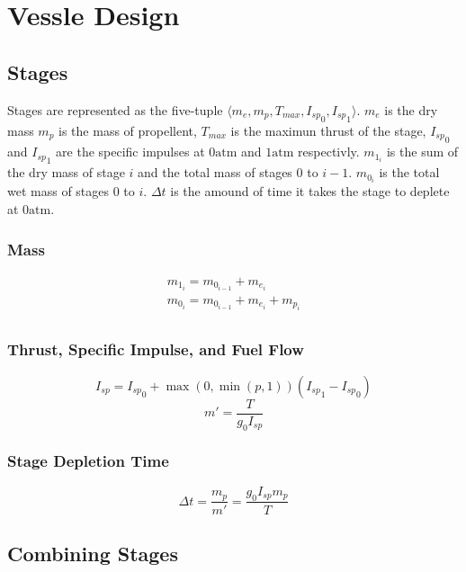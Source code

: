 \section{Vessle Design}
\subsection{Stages}
Stages are represented as the five-tuple $\langle m_e, m_p, T_{max}, {I_{sp}}_0, {I_{sp}}_1 \rangle$. $m_e$ is the dry mass
$m_p$ is the mass of propellent, $T_{max}$ is the maximun thrust of the stage, ${I_{sp}}_0$ and ${I_{sp}}_1$ are the specific impulses at
$0\mathrm{atm}$ and $1\mathrm{atm}$ respectivly. $m_{1_i}$ is the sum of the dry mass of stage $i$ and the total mass of stages 0 to $i-1$.
$m_{0_i}$ is the total wet mass of stages 0 to $i$. $\Delta{}t$ is the amound of time it takes the stage to deplete at $0\mathrm{atm}$.
\subsubsection{Mass}
\begin{equation}
    \label{stage_mass}
    \begin{array}{c}
        m_{1_i} = m_{0_{i-1}} + m_{e_{i}} \\
        m_{0_i} = m_{0_{i-1}} + m_{e_{i}} + m_{p_{i}} \\
    \end{array}
\end{equation}
\subsubsection{Thrust, Specific Impulse, and Fuel Flow}
\begin{equation}
    \label{stage_isp}
    I_{sp} = {I_{sp}}_{0}+\max\left(0,\min\left(p,1\right)\right)\left({I_{sp}}_{1} - {I_{sp}}_{0}\right)
\end{equation}
\begin{equation}
    \label{stage_ff}
    m' = \frac{T}{g_{0}I_{sp}}
\end{equation}
\subsubsection{Stage Depletion Time}
\begin{equation}
    \label{stage_dt}
    \Delta{}t = \frac{m_{p}}{m'} = \frac{g_{0}I_{sp}m_p}{T}
\end{equation}
\subsection{Combining Stages}
